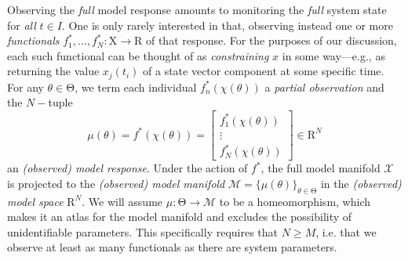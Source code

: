 \documentclass{article}
\newcommand{\D}{\mathrm{D}}
\newcommand{\p}{\theta}
\newcommand{\fmr}{\chi}
\newcommand{\fmm}{\mathcal{X}}
\newcommand{\fiber}{\mathcal{F}}
\newcommand{\omr}{\mu}
\newcommand{\omm}{\mathcal{M}}
\newcommand{\R}{\mathrm{R}}
\newcommand{\ps}{\mathrm{\Theta}}
\newcommand{\fms}{\mathrm{X}}
\begin{document}
Observing the \emph{full} model response amounts to monitoring the \emph{full} system state for \emph{all} $t \in I$.
One is only rarely interested in that, observing instead one or more \emph{functionals} $f^*_1 , \ldots , f^*_N : \fms \to \R$ of that response.
For the purposes of our discussion, each such functional can be thought of as \emph{constraining} $x$ in some way---e.g., as returning the value $x_j(t_i)$
of a state vector component at some specific time.
For any $\p\in\ps$, we term each individual $f^*_n(\fmr(\p))$ a \emph{partial observation} and the $N-$tuple
%
\[
 \mu(\p)
=
 f^*(\fmr(\p))
=
\left[\begin{array}{c}
 f^*_1(\fmr(\p)) \\ \vdots \\ f^*_N(\fmr(\p))
\end{array}\right]
\in
 \R^N
\]
%
an \emph{(observed) model response}.
Under the action of $f^*$, the full model manifold $\fmm$ is projected to
the \emph{(observed) model manifold} $\omm = \{ \omr(\p) \}_{\p \in \ps}$
in the \emph{(observed) model space} $\R^N$.
We will assume $\omr : \ps \to \omm$ to be a homeomorphism,
which makes it an atlas for the model manifold
and excludes the possibility of unidentifiable parameters.
This specifically requires that $N \ge M$, i.e. that we observe at least as many functionals as there are system parameters.\\
\end{document}
